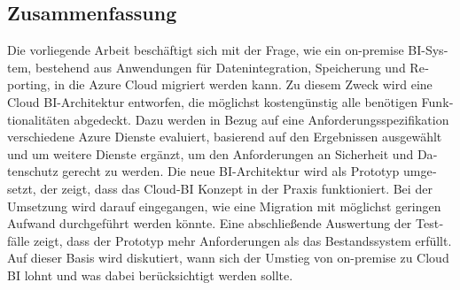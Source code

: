 \begin{otherlanguage}{ngerman}
	\chapter*{Zusammenfassung}
Die vorliegende Arbeit beschäftigt sich mit der Frage, wie ein on-premise BI-System, bestehend aus Anwendungen für Datenintegration, Speicherung und Reporting, in die Azure Cloud migriert werden kann. Zu diesem Zweck wird eine Cloud BI-Architektur entworfen, die möglichst kostengünstig alle benötigen Funktionalitäten abgedeckt. Dazu werden in Bezug auf eine Anforderungsspezifikation verschiedene Azure Dienste evaluiert, basierend auf den Ergebnissen ausgewählt und um weitere Dienste ergänzt, um den Anforderungen an Sicherheit und Datenschutz gerecht zu werden. 
Die neue BI-Architektur wird als Prototyp umgesetzt, der zeigt, dass das Cloud-BI Konzept in der Praxis funktioniert. Bei der Umsetzung wird darauf eingegangen, wie eine Migration mit möglichst geringen Aufwand durchgeführt werden könnte. Eine abschließende Auswertung der Testfälle zeigt, dass der Prototyp mehr Anforderungen als das Bestandssystem erfüllt. Auf dieser Basis wird diskutiert, wann sich der Umstieg von on-premise zu Cloud BI lohnt und was dabei berücksichtigt werden sollte.
\end{otherlanguage}
